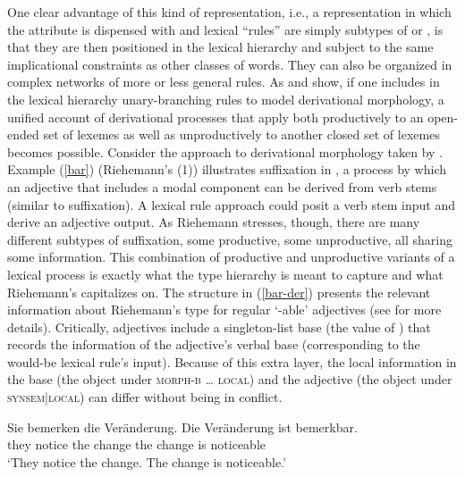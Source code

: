 \documentclass[output=paper
 	        ,biblatex
                ,babelshorthands
                ,newtxmath
                ,draftmode
                ,colorlinks, citecolor=brown
]{langscibook}
\begin{document}
One clear advantage of this kind of representation, i.e., a representation in which the attribute
 is dispensed with and lexical ``rules'' are simply subtypes of  or
, is that they are then positioned in the lexical hierarchy and subject to the
same implicational constraints as other classes of words.  They can also be organized in complex
networks of more or less general rules.  As \citet{Riehemann1998} and \citet{Koenig1999c} show, if
one includes in the lexical hierarchy unary-branching rules to model derivational morphology, a
unified account of derivational processes that apply both productively to an open-ended set of
lexemes as well as unproductively to another closed set of lexemes becomes possible.  Consider the
approach to derivational morphology taken by \citet{Riehemann1998}. Example
(\ref{bar}) (Riehemann's (1)) illustrates  suffixation in ,
a process by which an adjective that includes a modal component can be derived from verb stems
(similar to   suffixation).  A lexical rule approach could posit a verb
stem input and derive an adjective output.  As Riehemann stresses, though, there are many different
subtypes of  suffixation, some productive, some unproductive, all sharing some
information.  This combination of productive and unproductive variants of a lexical process is
exactly what the type hierarchy is meant to capture and what Riehemann's  capitalizes on.  The structure in (\ref{bar-der}) presents the relevant
information about Riehemann's type for regular  `-able' adjectives (see
\citealt[68]{Riehemann1998} for more details).  Critically,  adjectives include a
singleton-list base (the value of ) that records the information of the adjective's
verbal base (corresponding to the would-be lexical rule's input).  Because of this extra layer, the
local information in the base (the  object under \textsc{morph-b} \ldots{} \textsc{local}) and the  adjective
(the  object under \textsc{synsem|local}) can differ without being in conflict.

\ea
\label{bar}
\gll Sie  bemerken die Veränderung. Die Veränderung ist bemerkbar. \\
     they notice   the change       the change      is  noticeable \\
\glt `They notice the change. The change is noticeable.'
\z
\end{document}
